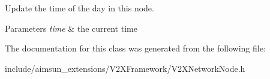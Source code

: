 Update the time of the day in this node. 


\begin{DoxyParams}{Parameters}
{\em time} & the current time \\
\hline
\end{DoxyParams}


The documentation for this class was generated from the following file\+:\begin{DoxyCompactItemize}
\item 
include/aimsun\+\_\+extensions/\+V2\+X\+Framework/V2\+X\+Network\+Node.\+h\end{DoxyCompactItemize}
